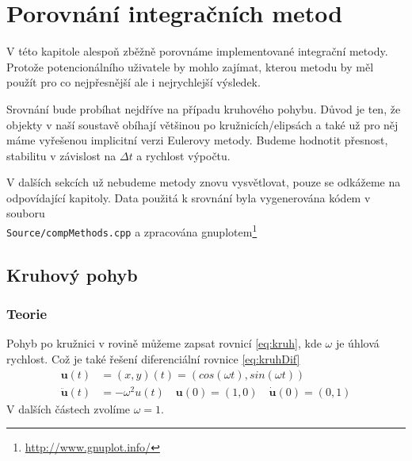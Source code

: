 \chapter{Porovnání integračních metod}
\label{chap:compMethods}
V této kapitole alespoň zběžně porovnáme implementované integrační metody. Protože potencionálního uživatele by mohlo zajímat, kterou metodu by měl použít pro co nejpřesnější ale i nejrychlejší výsledek.

Srovnání bude probíhat nejdříve na případu kruhového pohybu. Důvod je ten, že objekty v naší soustavě obíhají většinou po kružnicích/elipsách a také už pro něj máme vyřešenou implicitní verzi Eulerovy metody. Budeme hodnotit přesnost, stabilitu v závislost na $ \Delta t $ a rychlost výpočtu.

V dalších sekcích už nebudeme metody znovu vysvětlovat, pouze se odkážeme na odpovídající kapitoly. Data použitá k srovnání byla vygenerována kódem v souboru \\ \texttt{Source/compMethods.cpp} a zpracována gnuplotem\footnote{\url{http://www.gnuplot.info/}}

\section{Kruhový pohyb}
\subsection{Teorie}
Pohyb po kružnici v rovině můžeme zapsat rovnicí \eqref{eq:kruh}, kde $\omega$ je úhlová rychlost. Což je také řešení diferenciální rovnice \eqref{eq:kruhDif}
\begin{align}
\label{eq:kruh}
\boldsymbol{u}(t) &= (x,y)(t)=(cos(\omega t),sin(\omega t))\\
\label{eq:kruhDif}
\ddot{\boldsymbol{u}}(t)&=-\omega^2u(t) \quad \boldsymbol{u}(0)=(1,0) \quad \dot{\boldsymbol{u}}(0)=(0,1)
\end{align}
V dalších částech zvolíme $ \omega = 1 $.
